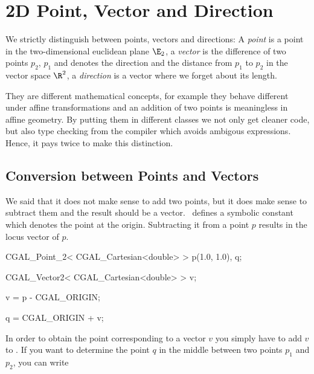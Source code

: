 
\cleardoublepage
\chapter{2D Point, Vector and Direction \label{PointVectorDirection}}


We strictly distinguish between points, vectors and directions: 
A {\em point} is a point in the two-dimensional euclidean plane
$\E_2$, a {\em vector} is the difference of two points $p_2$, $p_1$
and denotes the direction and the distance from $p_1$ to $p_2$ in the
vector space $\R^2$, a {\em direction} is a vector where we forget
about its length.

They are different mathematical concepts, for example they behave
different under affine transformations and an addition of two
points is meaningless in affine geometry.  By putting them in different
classes we not only get cleaner code, but also type checking from the
compiler which avoids ambigous expressions. Hence, it pays twice to
make this distinction.



\newpage


\newpage



\section{Conversion between Points and Vectors\label{conversion}}

We said that it does not make sense to add two points, but it does
make sense to subtract them and the result should be a vector. 
\cgal\ defines a symbolic constant   which denotes
the point at the origin.  Subtracting it from a
point $p$ results in the locus vector of $p$. 

\begin{cprog}

  CGAL_Point_2< CGAL_Cartesian<double> >  p(1.0, 1.0), q;

  CGAL_Vector2< CGAL_Cartesian<double> >  v;

  v = p - CGAL_ORIGIN;

  q = CGAL_ORIGIN + v;  
\end{cprog} 

In order to obtain the point corresponding to a vector $v$ you simply
have to add $v$ to . If you want to determine 
the point $q$ in the middle between two points $p_1$ and $p_2$, you can write

